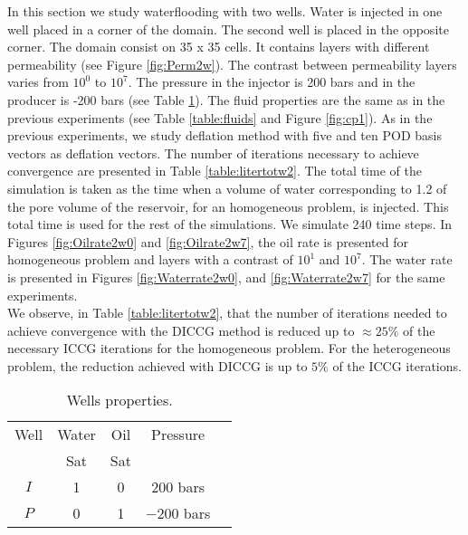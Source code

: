 \documentclass[12pt]{article}
\begin{document}
In this section we study waterflooding with two wells. Water is injected in one well placed in a corner of the domain. The second well is placed in the opposite corner. The domain consist on 35 x 35 cells. It contains layers with different permeability (see Figure \ref{fig:Perm2w}). The contrast between permeability layers varies from $10^0$ to $10^7$. The pressure in the injector is 200 bars and in the producer is -200 bars (see Table \ref{table:wells2}). The fluid properties are the same as in the previous experiments (see Table \ref{table:fluids} and Figure \ref{fig:cp1}). As in the previous experiments, we study deflation method with five and ten POD basis vectors as deflation vectors. The number of iterations necessary to achieve convergence are presented in Table \ref{table:litertotw2}. The total time of the simulation is taken as the time when a volume of water corresponding to 1.2 of the pore volume of the reservoir, for an homogeneous problem, is injected. This total time is used for the rest of the simulations. We simulate 240 time steps. In Figures \ref{fig:Oilrate2w0} \label{fig:Oilrate2w1} and \ref{fig:Oilrate2w7}, the oil rate is presented for homogeneous problem and layers with a contrast of $10^1$ and $10^7$. The water rate is presented in Figures \ref{fig:Waterrate2w0}, \label{fig:Waterrate2w1} and \ref{fig:Waterrate2w7} for the same experiments.\\
We observe, in Table \ref{table:litertotw2}, that the number of iterations needed to achieve convergence with the DICCG method is reduced up to $\approx 25\%$ of the necessary ICCG iterations for the homogeneous problem. For the heterogeneous problem, the reduction achieved with DICCG is up to $5\%$ of the ICCG iterations.  



\begin{table}
\hspace{-0cm}
\centering
\begin{minipage}{.4\textwidth}
\begin{tabular}{ |c|c|c|c|c|} 
\hline
Well&Water&Oil &Pressure\\
&Sat&Sat&\\
\hline
$I$&     1&    0 & $200$ bars \\  
$P$& 0& 1& $-200$ bars\\
\hline
\end{tabular}
\caption{Wells properties.}\label{table:wells2}
\end{minipage}
\end{table}
\end{document}

